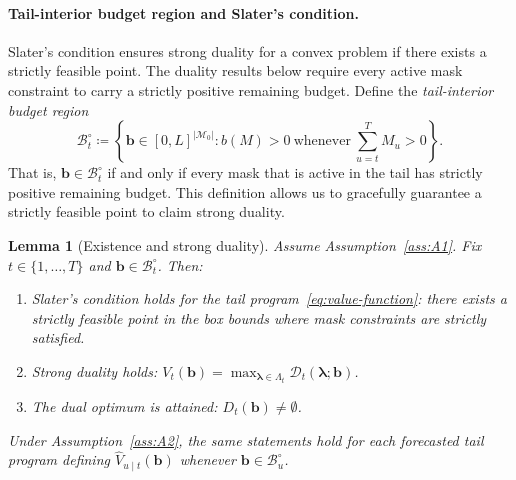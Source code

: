 \documentclass[11pt]{article}
\newtheorem{lemma}{Lemma}[section]
\newcommand{\1}{\mathbf{1}}
\newcommand{\eqdef}{\coloneqq}
\newcommand{\mcal}{\mathcal{M}}
\newcommand{\bcal}{\mathcal{B}}
\begin{document}

\paragraph{Tail-interior budget region and Slater's condition.}
Slater's condition ensures strong duality for a convex problem if there exists a strictly feasible point.
The duality results below require every active mask constraint to carry a strictly positive remaining budget.
Define the \emph{tail-interior budget region}
\begin{equation*}
  \bcal_t^\circ
  \eqdef
  \left\{\mathbf{b} \in [0,L]^{|\mcal_{0}|}
  : b(M) > 0 \ \text{whenever}\ \sum_{u=t}^{T} M_u > 0\right\}.
\end{equation*}
That is, $\mathbf{b} \in \bcal_t^\circ$ if and only if every mask that is active in the tail has strictly positive remaining budget. This definition allows us to gracefully guarantee a strictly feasible point to claim strong duality.


\begin{lemma}[Existence and strong duality]
  \label{lem:slater-attainment}
  Assume Assumption~\ref{ass:A1}.
  Fix $t \in \{1,\dots,T\}$ and $\mathbf{b} \in \bcal_t^\circ$.
  Then:
  \begin{enumerate}
    \item Slater's condition holds for the tail program~\eqref{eq:value-function}: there exists a strictly feasible point in the box bounds where mask constraints are strictly satisfied.
    \item Strong duality holds:
      $V_t(\mathbf{b})
      = \max_{\boldsymbol{\lambda}\in\Lambda_t}
      \mathcal{D}_t(\boldsymbol{\lambda};\mathbf{b})$.
    \item The dual optimum is attained: $D_t(\mathbf{b}) \neq \emptyset$.
  \end{enumerate}

  Under Assumption~\ref{ass:A2}, the same statements hold for each forecasted tail program defining $\hat{V}_{u \mid t}(\mathbf{b})$ whenever $\mathbf{b} \in \bcal_u^\circ$.
\end{lemma}
\end{document}
